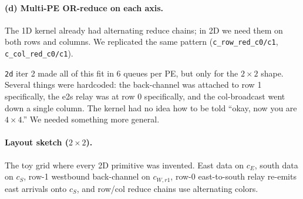 \documentclass[11pt]{article}
\newcommand{\code}[1]{\texttt{#1}}
\begin{document}
\paragraph{(d) Multi-PE OR-reduce on each axis.} The 1D kernel
already had alternating reduce chains; in 2D we need them on
both rows and columns. We replicated the same pattern
(\code{c\_row\_red\_c0/c1}, \code{c\_col\_red\_c0/c1}).

\code{2d} iter 2 made all of this fit in 6 queues per PE, but
only for the $2 \times 2$ shape. Several things were hardcoded:
the back-channel was attached to row 1 specifically, the e2s
relay was at row 0 specifically, and the col-broadcast went
down a single column. The kernel had no idea how to be told
``okay, now you are $4 \times 4$.'' We needed something more
general.

\paragraph{Layout sketch ($2 \times 2$).}
The toy grid where every 2D primitive was invented. East data
on $c_E$, south data on $c_S$, row-1 westbound back-channel
on $c_{W,r1}$, row-0 east-to-south relay re-emits east arrivals
onto $c_S$, and row/col reduce chains use alternating colors.

\begin{center}
\end{center}
\end{document}
